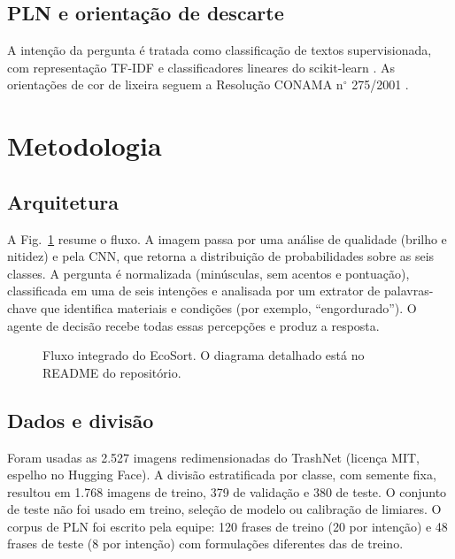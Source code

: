 \documentclass[conference]{IEEEtran}
\begin{document}
\subsection{PLN e orienta\c{c}\~ao de descarte}
A inten\c{c}\~ao da pergunta \'e tratada como classifica\c{c}\~ao de textos supervisionada, com representa\c{c}\~ao TF-IDF e classificadores lineares do scikit-learn \cite{pedregosa2011sklearn}. As orienta\c{c}\~oes de cor de lixeira seguem a Resolu\c{c}\~ao CONAMA n$^\circ$ 275/2001 \cite{conama2001}.

\section{Metodologia}
\subsection{Arquitetura}
A Fig.~\ref{fig:arq} resume o fluxo. A imagem passa por uma an\'alise de qualidade (brilho e nitidez) e pela CNN, que retorna a distribui\c{c}\~ao de probabilidades sobre as seis classes. A pergunta \'e normalizada (min\'usculas, sem acentos e pontua\c{c}\~ao), classificada em uma de seis inten\c{c}\~oes e analisada por um extrator de palavras-chave que identifica materiais e condi\c{c}\~oes (por exemplo, ``engordurado''). O agente de decis\~ao recebe todas essas percep\c{c}\~oes e produz a resposta.

\begin{figure}[t]
\centering
{}
\caption{Fluxo integrado do EcoSort. O diagrama detalhado est\'a no README do reposit\'orio.}
\label{fig:arq}
\end{figure}

\subsection{Dados e divis\~ao}
Foram usadas as 2.527 imagens redimensionadas do TrashNet (licen\c{c}a MIT, espelho no Hugging Face). A divis\~ao estratificada por classe, com semente fixa, resultou em 1.768 imagens de treino, 379 de valida\c{c}\~ao e 380 de teste. O conjunto de teste n\~ao foi usado em treino, sele\c{c}\~ao de modelo ou calibra\c{c}\~ao de limiares. O corpus de PLN foi escrito pela equipe: 120 frases de treino (20 por inten\c{c}\~ao) e 48 frases de teste (8 por inten\c{c}\~ao) com formula\c{c}\~oes diferentes das de treino.
\end{document}
